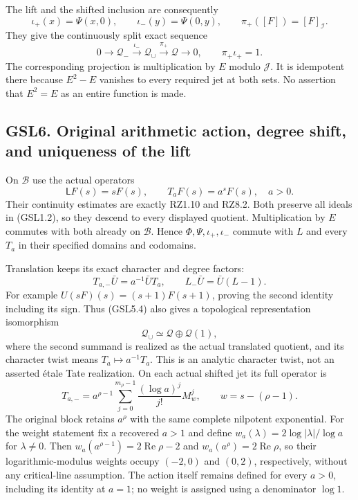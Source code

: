 The lift and the shifted inclusion are consequently \[
\iota_+(x)=\Psi(x,0),\qquad
\iota_-(y)=\Psi(0,y),\qquad
\pi_+([F])=[F]_{\mathcal I}.
\tag{GSL5.8}
\] They give the continuously split exact sequence \[
0\longrightarrow\mathcal Q_-\xrightarrow{\iota_-}
\mathcal Q_{\cup}\xrightarrow{\pi_+}\mathcal Q\longrightarrow0,
\qquad \pi_+\iota_+=1.
\tag{GSL5.9}
\] The corresponding projection is multiplication by \(E\) modulo
\(\mathcal J\). It is idempotent there because \(E^2-E\) vanishes to
every required jet at both sets. No assertion that \(E^2=E\) as an
entire function is made.

\subsection{GSL6. Original arithmetic action, degree shift, and
uniqueness of the
lift}\label{gsl6.-original-arithmetic-action-degree-shift-and-uniqueness-of-the-lift}

On \(\mathcal B\) use the actual operators \[
\mathsf L F(s)=sF(s),\qquad T_aF(s)=a^sF(s),\quad a>0.
\tag{GSL6.1}
\] Their continuity estimates are exactly RZ1.10 and RZ8.2. Both
preserve all ideals in (GSL1.2), so they descend to every displayed
quotient. Multiplication by \(E\) commutes with both already on
\(\mathcal B\). Hence \(\Phi,\Psi,\iota_+,\iota_-\) commute with \(L\)
and every \(T_a\) in their specified domains and codomains.

Translation keeps its exact character and degree factors: \[
T_{a,-}\bar U=a^{-1}\bar U T_a,
\qquad L_-\bar U=\bar U(L-1).
\tag{GSL6.2}
\] For example \(U(sF)(s)=(s+1)F(s+1)\), proving the second identity
including its sign. Thus (GSL5.4) also gives a topological
representation isomorphism \[
\mathcal Q_{\cup}\simeq\mathcal Q\oplus\mathcal Q(1),
\tag{GSL6.3}
\] where the second summand is realized as the actual translated
quotient, and its character twist means \(T_a\mapsto a^{-1}T_a\). This
is an analytic character twist, not an asserted étale Tate realization.
On each actual shifted jet its full operator is \[
T_{a,-}=a^{\rho-1}
 \sum_{j=0}^{m_\rho-1}\frac{(\log a)^j}{j!}M_w^j,
\qquad w=s-(\rho-1).
\tag{GSL6.4}
\] The original block retains \(a^\rho\) with the same complete
nilpotent exponential. For the weight statement fix a recovered \(a>1\)
and define \(w_a(\lambda)=2\log|\lambda|/\log a\) for \(\lambda\ne0\).
Then \(w_a(a^{\rho-1})=2\operatorname{Re}\rho-2\) and
\(w_a(a^\rho)=2\operatorname{Re}\rho\), so their logarithmic-modulus
weights occupy \((-2,0)\) and \((0,2)\), respectively, without any
critical-line assumption. The action itself remains defined for every
\(a>0\), including its identity at \(a=1\); no weight is assigned using
a denominator \(\log1\).

